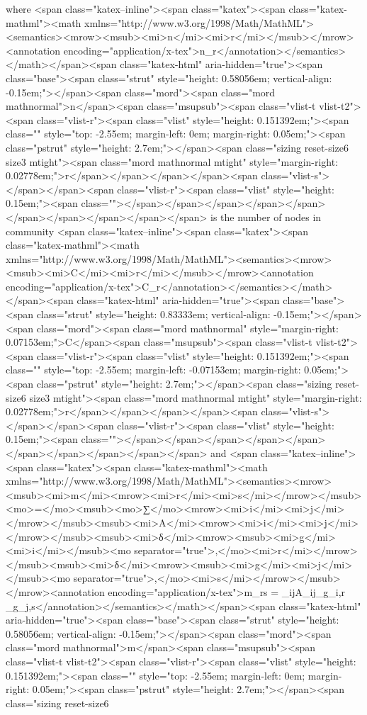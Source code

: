 where <span class="katex--inline"><span class="katex"><span class="katex-mathml"><math xmlns="http://www.w3.org/1998/Math/MathML"><semantics><mrow><msub><mi>n</mi><mi>r</mi></msub></mrow><annotation encoding="application/x-tex">n_r</annotation></semantics></math></span><span class="katex-html" aria-hidden="true"><span class="base"><span class="strut" style="height: 0.58056em; vertical-align: -0.15em;"></span><span class="mord"><span class="mord mathnormal">n</span><span class="msupsub"><span class="vlist-t vlist-t2"><span class="vlist-r"><span class="vlist" style="height: 0.151392em;"><span class="" style="top: -2.55em; margin-left: 0em; margin-right: 0.05em;"><span class="pstrut" style="height: 2.7em;"></span><span class="sizing reset-size6 size3 mtight"><span class="mord mathnormal mtight" style="margin-right: 0.02778em;">r</span></span></span></span><span class="vlist-s">​</span></span><span class="vlist-r"><span class="vlist" style="height: 0.15em;"><span class=""></span></span></span></span></span></span></span></span></span></span> is the number of nodes in community <span class="katex--inline"><span class="katex"><span class="katex-mathml"><math xmlns="http://www.w3.org/1998/Math/MathML"><semantics><mrow><msub><mi>C</mi><mi>r</mi></msub></mrow><annotation encoding="application/x-tex">C_r</annotation></semantics></math></span><span class="katex-html" aria-hidden="true"><span class="base"><span class="strut" style="height: 0.83333em; vertical-align: -0.15em;"></span><span class="mord"><span class="mord mathnormal" style="margin-right: 0.07153em;">C</span><span class="msupsub"><span class="vlist-t vlist-t2"><span class="vlist-r"><span class="vlist" style="height: 0.151392em;"><span class="" style="top: -2.55em; margin-left: -0.07153em; margin-right: 0.05em;"><span class="pstrut" style="height: 2.7em;"></span><span class="sizing reset-size6 size3 mtight"><span class="mord mathnormal mtight" style="margin-right: 0.02778em;">r</span></span></span></span><span class="vlist-s">​</span></span><span class="vlist-r"><span class="vlist" style="height: 0.15em;"><span class=""></span></span></span></span></span></span></span></span></span></span> and <span class="katex--inline"><span class="katex"><span class="katex-mathml"><math xmlns="http://www.w3.org/1998/Math/MathML"><semantics><mrow><msub><mi>m</mi><mrow><mi>r</mi><mi>s</mi></mrow></msub><mo>=</mo><msub><mo>∑</mo><mrow><mi>i</mi><mi>j</mi></mrow></msub><msub><mi>A</mi><mrow><mi>i</mi><mi>j</mi></mrow></msub><msub><mi>δ</mi><mrow><msub><mi>g</mi><mi>i</mi></msub><mo separator="true">,</mo><mi>r</mi></mrow></msub><msub><mi>δ</mi><mrow><msub><mi>g</mi><mi>j</mi></msub><mo separator="true">,</mo><mi>s</mi></mrow></msub></mrow><annotation encoding="application/x-tex">m_{rs} = \sum_{ij}A_{ij}\delta_{g_i,r} \delta_{g_j,s}</annotation></semantics></math></span><span class="katex-html" aria-hidden="true"><span class="base"><span class="strut" style="height: 0.58056em; vertical-align: -0.15em;"></span><span class="mord"><span class="mord mathnormal">m</span><span class="msupsub"><span class="vlist-t vlist-t2"><span class="vlist-r"><span class="vlist" style="height: 0.151392em;"><span class="" style="top: -2.55em; margin-left: 0em; margin-right: 0.05em;"><span class="pstrut" style="height: 2.7em;"></span><span class="sizing reset-size6 